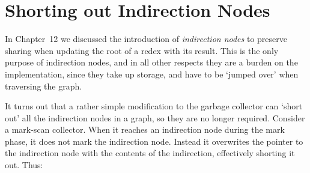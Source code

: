     \section{Shorting out Indirection Nodes}

    In Chapter~12 we discussed the introduction of \textit{indirection nodes} to preserve
    sharing when updating the root of a redex with its result. This is the only
    purpose of indirection nodes, and in all other respects they are a burden on
    the implementation, since they take up storage, and have to be `jumped over'
    when traversing the graph.

    It turns out that a rather simple modification to the garbage collector can
    `short out' all the indirection nodes in a graph, so they are no longer required.
    Consider a mark-scan collector. When it reaches an indirection node during
    the mark phase, it does not mark the indirection node. Instead it overwrites
    the pointer to the indirection node with the contents of the indirection,
    effectively shorting it out. Thus:

